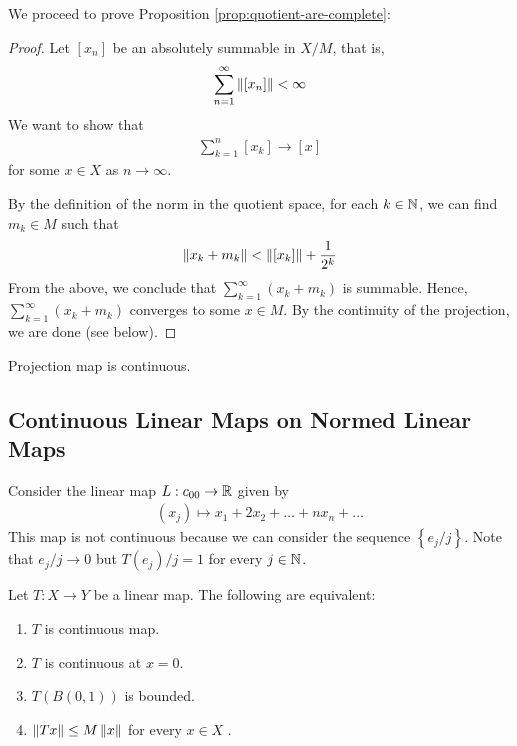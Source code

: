 We proceed to prove Proposition \ref{prop:quotient-are-complete}:

\begin{proof}
    Let $[x_{n}]$ be an absolutely summable in $X/M$, that is, 
    \begin{align*}
	\sum_{n=1}^{\infty} \left\lVert [x_{n}] \right\rVert < \infty
    \end{align*}
    We want to show that 
    \begin{align*}
	\sum_{k=1}^{n} [x_{k}] \to [x] 
    \end{align*}
    for some $x\in X$ as $n\to \infty$.

    By the definition of the norm in the quotient space, for each $k\in \mathbb N$, we can find $m_{k} \in M$ such that
    \begin{align*}
	\left\lVert x_{k} + m_{k} \right\rVert < \left\lVert [x_{k}] \right\rVert + \frac{1}{2^{k}}
    \end{align*}
    From the above, we conclude that $\sum_{k=1}^{\infty} (x_{k} + m_{k})$ is summable. Hence,  $\sum_{k=1}^{\infty} (x_{k} + m_{k})$ converges to some $x\in M$. By the continuity of the projection, we are done (see below).
\end{proof}

\begin{proposition}
    Projection map is continuous.
    \label{prop:proj-is-cont}
\end{proposition}

\subsection{Continuous Linear Maps on Normed Linear Maps}

\begin{example}
    Consider the linear map $L: c_{00} \to \mathbb R$ given by
    \begin{align*}
	\left( x_{j} \right) \mapsto x_{1} + 2 x_{2} + \ldots + nx_{n} + \ldots
    \end{align*}
    This map is not continuous because we can consider the sequence $\left\{ e_{j}/j \right\}$. Note that $e_{j} /j \to 0$ but $T\left( e_{j} \right)/j = 1$ for every $j\in \mathbb N$.
\end{example}

\begin{proposition}
    Let $T: X\to Y$ be a linear map. The following are equivalent:
    \begin{enumerate}
	\item $T$ is continuous map.
	\item $T$ is continuous at $x=0$.
	\item $T\left( B\left( 0,1 \right) \right)$ is bounded.
	\item $\left\lVert Tx \right\rVert \le M \left\lVert x \right\rVert$ for every $x\in X$ .
    \end{enumerate}
    \label{prop:equiv-lin-maps}
\end{proposition}

